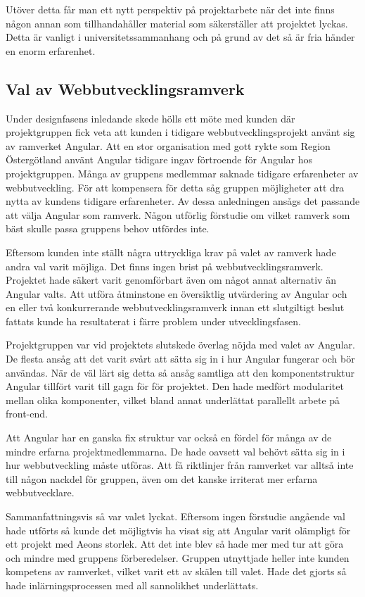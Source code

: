 Utöver detta får man ett nytt perspektiv på projektarbete när det inte finns någon annan som tillhandahåller material som säkerställer att projektet lyckas. Detta är vanligt i universitetssammanhang och på grund av det så är fria händer en enorm erfarenhet.

\subsection{Val av Webbutvecklingsramverk}

Under designfasens inledande skede hölls ett möte med kunden där projektgruppen fick veta att kunden i tidigare webbutvecklingsprojekt använt sig av ramverket Angular. Att en stor organisation med gott rykte som Region Östergötland använt Angular tidigare ingav förtroende för Angular hos projektgruppen. Många av gruppens medlemmar saknade tidigare erfarenheter av webbutveckling. För att kompensera för detta såg gruppen möjligheter att dra nytta av kundens tidigare erfarenheter. Av dessa anledningen ansågs det passande att välja Angular som ramverk. Någon utförlig förstudie om vilket ramverk som bäst skulle passa gruppens behov utfördes inte.

Eftersom kunden inte ställt några uttryckliga krav på valet av ramverk hade andra val varit möjliga. Det finns ingen brist på webbutvecklingsramverk. Projektet hade säkert varit genomförbart även om något annat alternativ än Angular valts. Att utföra åtminstone en översiktlig utvärdering av Angular och en eller två konkurrerande webbutvecklingsramverk innan ett slutgiltigt beslut fattats kunde ha resultaterat i färre problem under utvecklingsfasen.

Projektgruppen var vid projektets slutskede överlag nöjda med valet av Angular. De flesta ansåg att det varit svårt att sätta sig in i hur Angular fungerar och bör användas. När de väl lärt sig detta så ansåg samtliga att den komponentstruktur Angular tillfört varit till gagn för för projektet. Den hade medfört modularitet mellan olika komponenter, vilket bland annat underlättat parallellt arbete på front-end.

Att Angular har en ganska fix struktur var också en fördel för många av de mindre erfarna projektmedlemmarna. De hade oavsett val behövt sätta sig in i hur webbutveckling måste utföras. Att få riktlinjer från ramverket var alltså inte till någon nackdel för gruppen, även om det kanske irriterat mer erfarna webbutvecklare.

Sammanfattningsvis så var valet lyckat. Eftersom ingen förstudie angående val hade utförts så kunde det möjligtvis ha visat sig att Angular varit olämpligt för ett projekt med Aeons storlek. Att det inte blev så hade mer med tur att göra och mindre med gruppens förberedelser. Gruppen utnyttjade heller inte kunden kompetens av ramverket, vilket varit ett av skälen till valet. Hade det gjorts så hade inlärningsprocessen med all sannolikhet underlättats.

